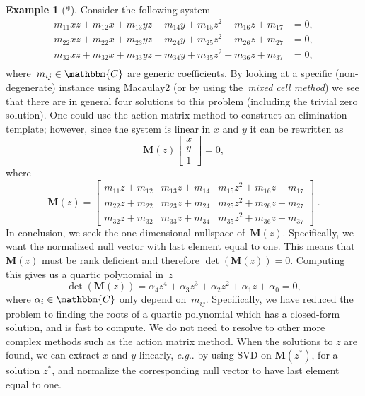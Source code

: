 \documentclass[11pt,a4paper]{article}
\makeatletter
\theoremstyle{definition}
\newtheorem{example}{Example}
\newcommand{\mat}[1]{\bm{#1}}
\newcommand{\C}{\ensuremath{\mathbbm{C}}}
\DeclareRobustCommand\eg{\emph{e.g}\@ifnextchar.{}{.\@}}
\makeatother
\begin{document}
\begin{example}[*]\label{ex:hidden2}
Consider the following system
\begin{equation}
\begin{aligned}
m_{11}xz + m_{12}x + m_{13}yz + m_{14}y + m_{15}z^2 + m_{16}z + m_{17} &= 0, \\
m_{22}xz + m_{22}x + m_{23}yz + m_{24}y + m_{25}z^2 + m_{26}z + m_{27} &= 0, \\
m_{32}xz + m_{32}x + m_{33}yz + m_{34}y + m_{35}z^2 + m_{36}z + m_{37} &= 0, \\
\end{aligned}
\end{equation}
where~$m_{ij}\in\C$ are generic coefficients.
By looking at a specific (non-degenerate) instance using Macaulay2
(or by using the~\emph{mixed cell method}) we see that there are in
general four solutions to this problem (including the trivial zero solution). One could use the action matrix method to construct an
elimination template; however, since the system is linear in $x$ and $y$ it can be rewritten as
\begin{equation}\label{eq:specialnullvector}
\mat{M}(z)
\begin{bmatrix}
x \\
y \\
1
\end{bmatrix}
= 0,
\end{equation}
where
\begin{equation}
\mat{M}(z)=
\begin{bmatrix}
    m_{11}z + m_{12} & m_{13}z + m_{14} & m_{15}z^2 + m_{16}z + m_{17} \\
    m_{22}z + m_{22} & m_{23}z + m_{24} & m_{25}z^2 + m_{26}z + m_{27} \\
    m_{32}z + m_{32} & m_{33}z + m_{34} & m_{35}z^2 + m_{36}z + m_{37}
\end{bmatrix}\;.
\end{equation}
In conclusion, we seek the one-dimensional nullspace of~$\mat{M}(z)$. Specifically, we want
the normalized null vector with last element equal to one. This means that $\mat{M}(z)$ must
be rank deficient and therefore $\det(\mat{M}(z))=0$. Computing this gives us a
quartic polynomial in~$z$
\begin{equation}
    \det(\mat{M}(z)) =
    \alpha_4 z^4 +
    \alpha_3 z^3 +
    \alpha_2 z^2 +
    \alpha_1 z +
    \alpha_0 = 0,
\end{equation}
where $\alpha_i\in\C$ only depend on~$m_{ij}$. Specifically, we have reduced the problem to
finding the roots of a quartic polynomial which has a closed-form solution, and is fast to compute.
We do not need to resolve to other more complex methods such as the action matrix method.
When the solutions to $z$ are found, we can extract $x$ and $y$ linearly, \eg{} by using SVD
on $\mat{M}(z^*)$, for a solution $z^*$, and normalize the corresponding null vector to have
last element equal to one.
\end{example}
\end{document}
